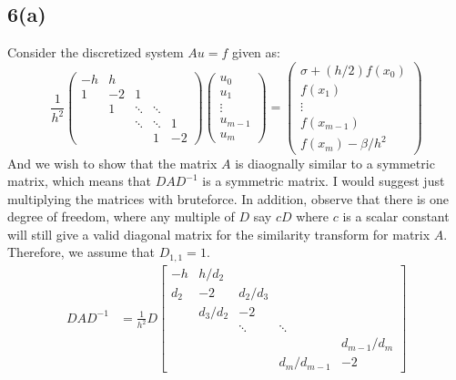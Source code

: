 \documentclass[]{article}
\begin{document}
    \subsection*{6(a)}
        Consider the discretized system $Au =f$ given as: 
        $$
            \frac{1}{h^{2}}\left(\begin{array}{ccccc}
            -h & h & & & \\
            1 & -2 & 1 & & \\
            & 1 & \ddots & \ddots & \\
            & & \ddots & \ddots & 1 \\
            & & & 1 & -2
            \end{array}\right)\left(\begin{array}{c}
            u_{0} \\
            u_{1} \\
            \vdots \\
            u_{m-1} \\
            u_{m}
            \end{array}\right)=\left(\begin{array}{c}
            \sigma+(h / 2) f\left(x_{0}\right) \\
            f\left(x_{1}\right) \\
            \vdots \\
            f\left(x_{m-1}\right) \\
            f\left(x_{m}\right)-\beta / h^{2}
            \end{array}\right)
        $$
        And we wish to show that the matrix $A$ is diaognally similar to a symmetric matrix, which means that $DAD^{-1}$ is a symmetric matrix. I would suggest just multiplying the matrices with bruteforce. In addition, observe that there is one degree of freedom, where any multiple of $D$  say $cD$ where $c$ is a scalar constant will still give a valid diagonal matrix for the similarity transform for matrix $A$. Therefore, we assume that $D_{1, 1} = 1$. 
        \begin{align*}\tag{6.a.1}\label{eqn:6.a.1}
            DAD^{-1} &= \frac{1}{h^2}D
            \begin{bmatrix}
                -h  &  h/d_2   &         & & \\
                d_2 &  -2      & d_2/d_3 & & \\
                    &  d_3/d_2 & -2      & & \\[0.6em]
                    &          &\ddots &\ddots &  \\         
                & & & & d_{m - 1}/d_m \\
                & & & d_m/d_{m - 1} &-2
            \end{bmatrix}
        \end{align*}
\end{document}
